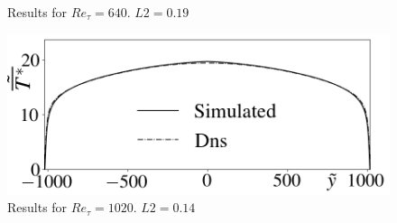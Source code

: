 \documentclass[xcolor=dvipsnames,8pt,aspectratio=34]{beamer}
\begin{document}
\begin{frame}
\begin{minipage}[h!]{0.5\textwidth}
\begin{figure}
				\caption{Results for $Re_\tau = 640$. $L2 = 0.19$}
			\end{figure}
			\begin{figure}
				\centering
				\includegraphics[angle=0, scale=0.24]{fotos_formatacao_final/Temperature_1000_071_Prt0905_A26}
				\caption{Results for $Re_\tau = 1020$. $L2 = 0.14$}
			\end{figure}
		\end{minipage}		
		\end{frame}	
	
	
	
	
	
	
	
\end{document}
